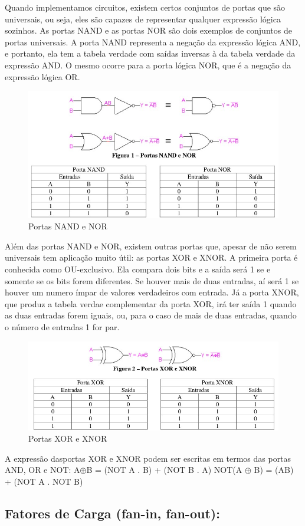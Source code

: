 \documentclass[12pt]{article}
\begin{document}
Quando implementamos circuitos, existem certos conjuntos de portas que são universais, ou seja, eles são capazes de representar qualquer expressão lógica sozinhos. As portas NAND e as portas NOR são dois exemplos de conjuntos de portas universais. A porta NAND representa a negação da expressão lógica AND, e portanto, ela tem a tabela verdade com saídas inversas à da tabela verdade da expressão AND. O mesmo ocorre para a porta lógica NOR, que é a negação da expressão lógica OR.

\begin{figure}[H]
	\centering
	\includegraphics[width=.5\textwidth]{nandnor.jpg}
	\caption{Portas NAND e NOR}
	\label{fig:exemplo}
\end{figure}

Além das portas NAND e NOR, existem outras portas que, apesar de não serem universais tem aplicação muito útil: as portas XOR e XNOR. A primeira porta é conhecida como OU-exclusivo. Ela compara dois bits e a saída será 1 se e somente se os bits forem diferentes. Se houver mais de duas entradas, aí será 1 se houver um numero ímpar de valores verdadeiros com entrada. Já a porta XNOR, que produz a tabela verdae complementar da porta XOR, irá ter saída 1 quando as duas entradas forem iguais, ou, para o caso de mais de duas entradas, quando o número de entradas 1 for par. 

\begin{figure}[H]
	\centering
	\includegraphics[width=.5\textwidth]{xorxnor.jpg}
	\caption{Portas XOR e XNOR}
	\label{fig:exemplo}
\end{figure}

A expressão dasportas XOR e XNOR podem ser escritas em termos das portas AND, OR e NOT:
A$\oplus$B = (NOT A . B) + (NOT B . A)
NOT(A $\oplus$ B) = (AB) + (NOT A . NOT B)


\subsection{ Fatores de Carga (fan-in, fan-out):}
\end{document}

